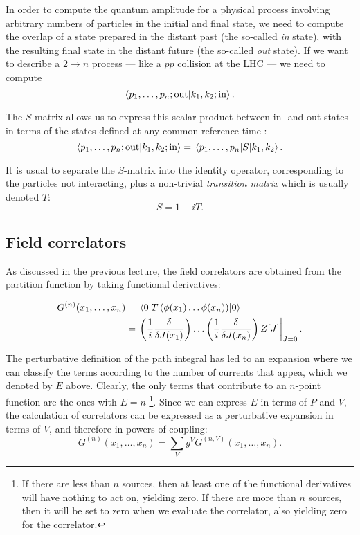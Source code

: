 \documentclass{article}
\numberwithin{equation}{section}
\begin{document}
In order to compute the quantum amplitude for a physical process involving arbitrary numbers of particles in the initial and final state, we need to compute the overlap of a state prepared in the distant past (the so-called \textit{in} state), with the resulting final state in the distant future (the so-called \textit{out} state). If we want to describe a $2 \rightarrow n$ process --- like a $pp$ collision at the LHC --- we need to compute 
\begin{equation}
    \braket{p_1, \dots , p_n; \text{out}}{k_1, k_2; \text{in}}.
\end{equation}

The $S$-matrix allows us to express this scalar product between in- and out-states in terms of the states defined at any common reference time :
\begin{equation}
    \braket{p_1, \dots , p_n; \text{out}}{k_1, k_2; \text{in}} = \mel{p_1, \dots , p_n}{S}{k_1, k_2}.
\end{equation}

It is usual to separate the $S$-matrix into the identity operator, corresponding to the particles not interacting, plus a non-trivial \textit{transition matrix} which is usually denoted $T$:
\begin{equation}
    S = 1 + iT.
\end{equation}




\subsection{Field correlators}
As discussed in the previous lecture, the field correlators are obtained from the partition function by taking functional derivatives:

\begin{equation}
\begin{aligned}
    G^{(n)}(x_1, \dots , x_n) &= \ev{T\left(\phi(x_1) \dots \phi(x_n)\right)}{0} \\
    &= \eval{\left(\frac{1}{i}\fdv{J(x_1)}\right) \dots \left(\frac{1}{i}\fdv{J(x_n)}\right) Z[J]}_{J=0}.
\end{aligned}
\end{equation}

The perturbative definition of the path integral has led to an expansion where we can classify the terms according to the number of currents that appea, which we denoted by $E$ above. Clearly, the only terms that contribute to an $n$-point function are the ones with $E=n$ \footnote{If there are less than $n$ sources, then at least one of the functional derivatives will have nothing to act on, yielding zero. If there are more than $n$ sources, then it will be set to zero when we evaluate the correlator, also yielding zero for the correlator.}. Since we can express $E$ in terms of $P$ and $V$, the calculation of correlators can be expressed as a perturbative expansion in terms of $V$, and therefore in powers of coupling:
\begin{equation}
    G^{(n)}(x_1, \dots, x_n) = \sum_V g^V G^{(n, V)}(x_1, \dots , x_n).
\end{equation}
\end{document}
